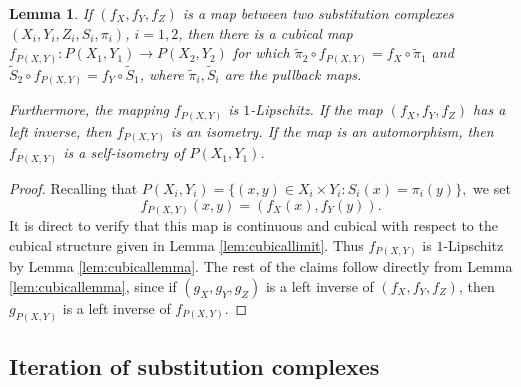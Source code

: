 \documentclass{amsart}
\theoremstyle{plain}
\newtheorem{lemma}[theorem]{Lemma}
\theoremstyle{definition}
\numberwithin{equation}{section}
\numberwithin{theorem}{section}
\begin{document}
\begin{lemma}\label{lem:morphism} If $(f_X,f_Y,f_Z)$ is a map between two substitution complexes $(X_i,Y_i,Z_i,S_i,\pi_i)$, $i=1,2$, then there is a cubical map $f_{P(X,Y)}:P(X_1,Y_1)\to P(X_2,Y_2)$ for which $\tilde{\pi}_2 \circ f_{P(X,Y)} = f_X \circ \tilde{\pi}_1$ and $\tilde{S}_2 \circ f_{P(X,Y)} = f_Y \circ \tilde{S}_1$, where $\tilde{\pi}_i, \tilde{S}_i$ are the pullback maps.

Furthermore, the mapping $f_{P(X,Y)}$ is $1$-Lipschitz. If the map $(f_X,f_Y,f_Z)$ has a left inverse, then $f_{P(X,Y)}$ is an isometry. If the map is an automorphism, then $f_{P(X,Y)}$ is a self-isometry of $P(X_1,Y_1)$.
\end{lemma}
\begin{proof}
Recalling that
$P(X_i,Y_i)=\{(x,y) \in X_i\times Y_i : S_i(x)=\pi_i(y)\},$
we set 
$$ f_{P(X,Y)}(x,y)=(f_X(x),f_Y(y)).$$
It is direct to verify that this map is continuous and cubical with respect to the cubical structure given in Lemma \ref{lem:cubicallimit}. Thus $f_{P(X,Y)}$ is $1$-Lipschitz by Lemma \ref{lem:cubicallemma}. The rest of the claims follow directly from Lemma \ref{lem:cubicallemma}, since if $(g_X,g_Y,g_Z)$ is a left inverse of $(f_X,f_Y,f_Z)$, then $g_{P(X,Y)}$ is a left inverse of $f_{P(X,Y)}$.
    \end{proof}

\subsection{Iteration of substitution complexes }\label{subsec:iteration}
\end{document}
